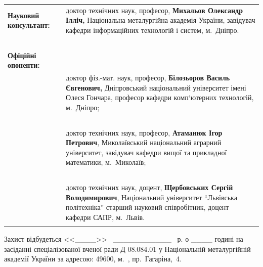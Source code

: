 \documentclass[a4paper,13pt]{atuaref}
\begin{document}
\noindent
\begin{tabular}{lp{}}
\textbf{Науковий консультант:}
&
доктор технічних наук, професор,\newline
\textbf{Михальов Олександр Ілліч,}\newline
Національна металургійна академія України, \newline
завідувач кафедри інформаційних технологій \newline
і систем, м.~Дніпро.
\\
{~} & {~}
\\
\textbf{Офіційні опоненти:}
{~}
\\
{~} &
доктор фіз.-мат. наук, професор,\newline
\textbf{Білозьоров Василь Євгенович,} \newline
Дніпровський національний університет імені \newline
Олеся Гончара, професор кафедри \newline
комп`ютерних технологій, м.~Дніпро;
\\
{~} & {~}
\\
{~} &
доктор технічних наук, професор,\newline
\textbf{Атаманюк Ігор Петрович}, \newline
Миколаївський національний аграрний університет, \newline
завідувач кафедри вищої та прикладної математики, м.~Миколаїв;
\\
{~} & {~}
\\
{~} &
доктор технічних наук, доцент,\newline
\textbf{Щербовських Сергій Володимирович}, \newline
Національний університет ``Львівська політехніка'' \newline
старший науковий співробітник, доцент кафедри САПР, м.~Львів.
\\
&
\end{tabular}


\vfill

Захист відбудеться
<<\_\_\_\_>>
~\_\_\_\_\_\_\_\_\_\_\_
\bookyear~р. о \_\_\_\_ годині
на засіданні спеціалізованої вченої ради Д 08.084.01 у Національній
металургійній академії України за адресою: 49600, м.~\cityUa,
пр.~Гагаріна,~4.
\end{document}
